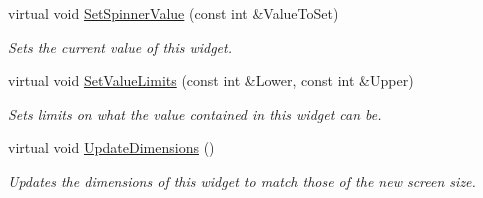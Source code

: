 \begin{DoxyCompactItemize}
virtual void \hyperlink{classMezzanine_1_1UI_1_1Spinner_a4bf3e5d71b3553f6991529a46b98750a}{SetSpinnerValue} (const int \&ValueToSet)
\begin{DoxyCompactList}\small\item\em Sets the current value of this widget. \item\end{DoxyCompactList}\item 
virtual void \hyperlink{classMezzanine_1_1UI_1_1Spinner_a9b427cbf7fb292461466d1987a441f43}{SetValueLimits} (const int \&Lower, const int \&Upper)
\begin{DoxyCompactList}\small\item\em Sets limits on what the value contained in this widget can be. \item\end{DoxyCompactList}\item 
virtual void \hyperlink{classMezzanine_1_1UI_1_1Spinner_a05358d8643601df5e552b687ce079899}{UpdateDimensions} ()
\begin{DoxyCompactList}\small\item\em Updates the dimensions of this widget to match those of the new screen size. \item\end{DoxyCompactList}\end{DoxyCompactItemize}

